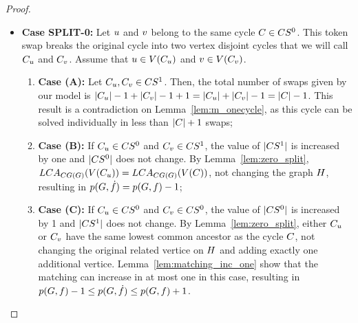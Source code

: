 \documentclass[msc]{ppgccufmg}    %
\begin{document}
\begin{proof}
\begin{itemize}
    \item \textbf{Case SPLIT-0:} Let $u$ and $v$ belong to 
    the same cycle $C \in CS^{0}$. 
    This token swap breaks the original cycle into two vertex disjoint cycles that
    we will call $C_{u}$ and $C_{v}$.
    Assume that $u \in V(C_{u})$ and 
    $v \in V(C_{v})$.
    
    \begin{enumerate}
        \item[] \textbf{Case (A):} Let $C_{u},C_{v} \in CS^{1}$.
        Then, the total number of swaps given by our model is $|C_{u}| - 1 + 
        |C_{v}| - 1 + 1 = |C_{u}| + 
        |C_{v}| - 1 = |C| - 1$.
        This result is a contradiction on Lemma~\ref{lem:m_onecycle}, as this cycle
        can be solved individually in less than $|C| + 1$ swaps;
        \item[] \textbf{Case (B):} If $C_{u} \in CS^{0}$ and 
        $C_{v} \in CS^{1}$, the value of $|CS^{1}|$
        is increased by one and $|CS^{0}|$ does not change.
        By Lemma~\ref{lem:zero_split}, $LCA_{CG(G)}(V(C_{u} )) = LCA_{CG(G)}(V(C))$, not changing the graph $H$, resulting
        in $p(G, \dot{f}) = p(G, f) - 1$;
        \item[] \textbf{Case (C):} If $C_{u} \in CS^{0}$ and 
        $C_{v} \in CS^{0}$, the value of $|CS^{0}|$
        is increased by 1 and $|CS^{1}|$ does not change.
        By Lemma~\ref{lem:zero_split}, either $C_{u}$ or $C_{v}$
        have the same lowest common ancestor as the cycle $C$, not changing 
        the original related vertice on $H$ and adding exactly one
        additional vertice.
        Lemma~\ref{lem:matching_inc_one} show that the matching can increase in 
        at most one in this case, resulting in $p(G, f) - 1 
        \leq p(G, \dot{f}) \leq p(G, 
        f) + 1$.
    \end{enumerate}
    

\end{itemize}
\end{proof}
\end{document}

